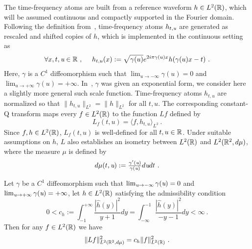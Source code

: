 The time-frequency atoms are built from a reference waveform $h\in L^2(\mathbb{R})$, which will be assumed continuous and compactly supported in the Fourier domain.
Following the definition from~\cite{holighaus2012framework,velasco2011constructing}, time-frequency atoms $h_{t,\textit{u}}$ are generated as rescaled and shifted copies of $h$, which is implemented in the continuous setting as
\begin{equation}
	\forall x,t,\textit{u}\in\mathbb{R}\ ,\quad \ h_{t,u}(x) := \sqrt{\gamma(u)}e^{2i\pi\gamma(u)x}h(\gamma(u)x-t)\ .
\end{equation}
Here, $\gamma$ is a $C^1$ diffeomorphism such that $\lim_{u\to-\infty}\gamma(u)=0$ and $\lim_{u\to+\infty}\gamma(u)=+\infty$. In~\cite{holighaus2012framework,velasco2011constructing}, $\gamma$ was given an exponential form, we consider here a slightly more general such scale function. Time-frequency atoms $h_{t,u}$ are normalized so that $\|h_{t,u}\|_{L^2}=\|h\|_{L^2}$ for all $t,u$. The corresponding constant-Q transform maps every $f\in L^2(\mathbb{R})$ to the function $Lf$ defined by
\begin{equation}
L_f(t,u)=\langle f,h_{t,u}\rangle_{L^2}\ .
\end{equation}
Since $f,h\in L^2(\mathbb{R})$, $L_f(t,u)$ is well-defined for all $t,u\in\mathbb{R}$. Under suitable assumptions on $h$, $L$ also establishes an isometry between $L^2(\mathbb{R})$ and $L^2(\mathbb{R}^2,d\mu)$, where the measure $\mu$ is defined by
\begin{equation}
\label{fo:CQT.measure}
d\mu(t,\textit{u}) := \tfrac{\gamma'(\textit{u})}{\gamma(\textit{u})}d\textit{u} dt \ .
\end{equation}
\begin{prop}\label{prop_norm_relation_operator_Q_transform}
Let $\gamma$ be a $C^1$ diffeomorphism such that $\lim_{\textit{u}\to -\infty}\gamma(\textit{u})=0$ and $\lim_{\textit{u}\to +\infty}\gamma(\textit{u})=+\infty$, let $h\in L^2(\mathbb{R})$ satisfying the admissibility condition
\begin{equation}
\label{fo:CQT.admissibility}
    0<c_h := \int_{-1}^{+\infty}\frac{|\hat{h}(y)|^2}{y+1}dy = \int_{-\infty}^{-1}\frac{|\hat{h}(y)|^2}{-y-1}dy<\infty\ .
\end{equation}
Then for any $f\in L^2(\mathbb{R})$ we have
\begin{equation}
\label{fo:CQT_isometry}
    \|Lf\|^2_{L^2(\mathbb{R}^2,d\mu)} = c_h \|f\|_{L^2(\mathbb{R})}^2\ .
\end{equation}
\end{prop}
